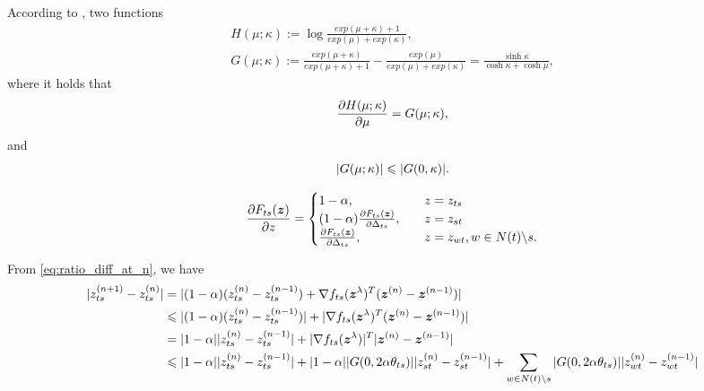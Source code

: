\documentclass[conference,onecolumn]{IEEEtran}
\begin{document}
According to \cite{roosta2008reweighed_sum_product}, two functions
\begin{align}
  H(\mu; \kappa) := \log \frac{exp(\mu + \kappa) +1}{exp(\mu) + exp(\kappa)}, \nonumber \\
  G(\mu; \kappa) := \frac{exp(\mu + \kappa)}{exp(\mu + \kappa) + 1} - \frac{exp(\mu)}{exp(\mu) + exp(\kappa)} = \frac{\sinh{\kappa}}{\cosh{\kappa} + \cosh{\mu}},
\end{align}
where it holds that
\begin{equation}
  \frac{ \partial H(\mu; \kappa)}{\partial \mu} = G(\mu; \kappa),
\end{equation}
and
\begin{equation}
  | G(\mu; \kappa) | \leqslant | G(0, \kappa) |.
\end{equation}

\begin{equation}\label{eq:F_pd}
  \frac{ \partial F_{ts}(\bm{z})}{\partial z}=
  \begin{cases}
    1 - \alpha, &\quad z = z_{ts}  \\
    ( 1 - \alpha) \frac{ \partial F_{ts}(\bm{z})}{\partial \Delta_{ts}}, &\quad z = z_{st} \\
    \frac{ \partial F_{ts}(\bm{z})}{\partial \Delta_{ts}}, &\quad z = z_{wt}, w\in N(t)\backslash s.
  \end{cases}
\end{equation}

From \eqref{eq:ratio_diff_at_n}, we have
\begin{align}
  | z_{ts}^{(n+1)} - z_{ts}^{(n)} | & = | (1-\alpha) (z_{ts}^{(n)} - z_{ts}^{(n-1)}) + \nabla f_{ts}(\bm{z}^{\lambda})^{T} (\bm{z}^{(n)} - \bm{z}^{(n-1)}) | \nonumber \\
                                      & \leqslant | (1-\alpha) (z_{ts}^{(n)} - z_{ts}^{(n-1)}) | + | \nabla f_{ts}(\bm{z}^{\lambda})^{T} (\bm{z}^{(n)} - \bm{z}^{(n-1)}) | \nonumber \\
                                      & = |  1 - \alpha | | z_{ts}^{(n)} - z_{ts}^{(n-1)} | + | \nabla f_{ts}(\bm{z}^{\lambda}) |^{T} | \bm{z}^{(n)} - \bm{z}^{(n-1)} | \nonumber \\
  & \leqslant |  1 - \alpha | | z_{ts}^{(n)} - z_{ts}^{(n-1)} | + |  1 - \alpha | | G(0, 2 \alpha \theta_{ts}) | | z_{st}^{(n)} - z_{st}^{(n-1)} | + \sum_{w\in N(t)\backslash s} | G(0, 2 \alpha \theta_{ts}) | | z_{wt}^{(n)} - z_{wt}^{(n-1)} |
\end{align}





% 



% 
\end{document}
